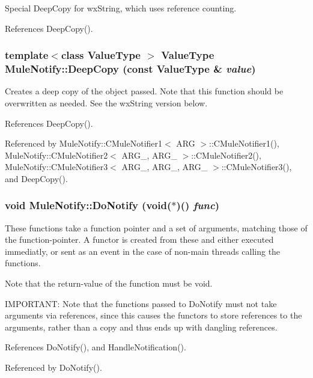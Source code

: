 Special DeepCopy for wxString, which uses reference counting. 

References DeepCopy().
\subsubsection[{DeepCopy}]{\setlength{\rightskip}{0pt plus 5cm}template$<$class ValueType $>$ ValueType MuleNotify::DeepCopy (const ValueType \& {\em value})\hspace{0.3cm}{\ttfamily  [inline]}}\label{namespaceMuleNotify_a52becaa2fd47df78508791f3e136c9a0}


Creates a deep copy of the object passed. Note that this function should be overwritten as needed. See the wxString version below. 

References DeepCopy().

Referenced by MuleNotify::CMuleNotifier1$<$ ARG $>$::CMuleNotifier1(), MuleNotify::CMuleNotifier2$<$ ARG\_, ARG\_ $>$::CMuleNotifier2(), MuleNotify::CMuleNotifier3$<$ ARG\_, ARG\_, ARG\_ $>$::CMuleNotifier3(), and DeepCopy().
\subsubsection[{DoNotify}]{\setlength{\rightskip}{0pt plus 5cm}void MuleNotify::DoNotify (void($\ast$)() {\em func})\hspace{0.3cm}{\ttfamily  [inline]}}\label{namespaceMuleNotify_a24cb75f403ae3553cbb327a3c84c87eb}


These functions take a function pointer and a set of arguments, matching those of the function-\/pointer. A functor is created from these and either executed immediatly, or sent as an event in the case of non-\/main threads calling the functions.

Note that the return-\/value of the function must be void.

IMPORTANT: Note that the functions passed to DoNotify must not take arguments via references, since this causes the functors to store references to the arguments, rather than a copy and thus ends up with dangling references. 

References DoNotify(), and HandleNotification().

Referenced by DoNotify().
